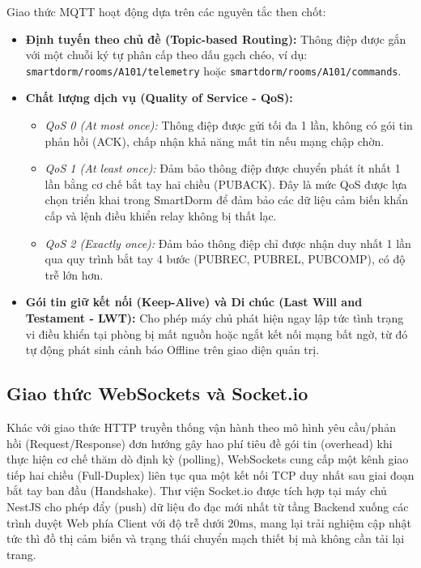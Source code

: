 Giao thức MQTT hoạt động dựa trên các nguyên tắc then chốt:
\begin{itemize}
    \item \textbf{Định tuyến theo chủ đề (Topic-based Routing):} Thông điệp được gắn với một chuỗi ký tự phân cấp theo dấu gạch chéo, ví dụ: \texttt{smartdorm/rooms/A101/telemetry} hoặc \texttt{smartdorm/rooms/A101/commands}.
    \item \textbf{Chất lượng dịch vụ (Quality of Service - QoS):}
    \begin{itemize}
        \item \textit{QoS 0 (At most once):} Thông điệp được gửi tối đa 1 lần, không có gói tin phản hồi (ACK), chấp nhận khả năng mất tin nếu mạng chập chờn.
        \item \textit{QoS 1 (At least once):} Đảm bảo thông điệp được chuyển phát ít nhất 1 lần bằng cơ chế bắt tay hai chiều (PUBACK). Đây là mức QoS được lựa chọn triển khai trong SmartDorm để đảm bảo các dữ liệu cảm biến khẩn cấp và lệnh điều khiển relay không bị thất lạc.
        \item \textit{QoS 2 (Exactly once):} Đảm bảo thông điệp chỉ được nhận duy nhất 1 lần qua quy trình bắt tay 4 bước (PUBREC, PUBREL, PUBCOMP), có độ trễ lớn hơn.
    \end{itemize}
    \item \textbf{Gói tin giữ kết nối (Keep-Alive) và Di chúc (Last Will and Testament - LWT):} Cho phép máy chủ phát hiện ngay lập tức tình trạng vi điều khiển tại phòng bị mất nguồn hoặc ngắt kết nối mạng bất ngờ, từ đó tự động phát sinh cảnh báo Offline trên giao diện quản trị.
\end{itemize}

\subsection{Giao thức WebSockets và Socket.io}
Khác với giao thức HTTP truyền thống vận hành theo mô hình yêu cầu/phản hồi (Request/Response) đơn hướng gây hao phí tiêu đề gói tin (overhead) khi thực hiện cơ chế thăm dò định kỳ (polling), WebSockets cung cấp một kênh giao tiếp hai chiều (Full-Duplex) liên tục qua một kết nối TCP duy nhất sau giai đoạn bắt tay ban đầu (Handshake). Thư viện Socket.io được tích hợp tại máy chủ NestJS cho phép đẩy (push) dữ liệu đo đạc mới nhất từ tầng Backend xuống các trình duyệt Web phía Client với độ trễ dưới $20\text{ms}$, mang lại trải nghiệm cập nhật tức thì đồ thị cảm biến và trạng thái chuyển mạch thiết bị mà không cần tải lại trang.

